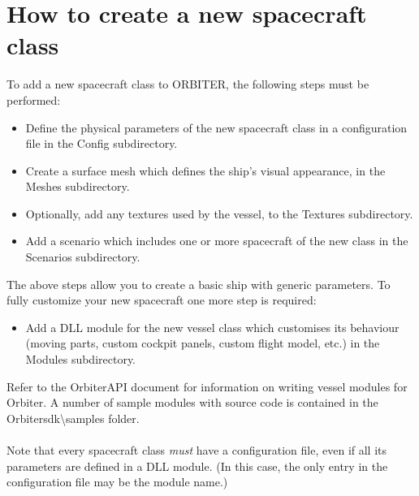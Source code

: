 \documentclass[Orbiter Developer Manual.tex]{subfiles}
\begin{document}
\section{How to create a new spacecraft class}
To add a new spacecraft class to ORBITER, the following steps must be performed:

\begin{itemize}
\item Define the physical parameters of the new spacecraft class in a configuration file in the Config subdirectory.
\item Create a surface mesh which defines the ship’s visual appearance, in the Meshes subdirectory.
\item Optionally, add any textures used by the vessel, to the Textures subdirectory.
\item Add a scenario which includes one or more spacecraft of the new class in the Scenarios subdirectory.
\end{itemize}

\noindent
The above steps allow you to create a basic ship with generic parameters. To fully customize your new spacecraft one more step is required:

\begin{itemize}
\item Add a DLL module for the new vessel class which customises its behaviour (moving parts, custom cockpit panels, custom flight model, etc.) in the Modules subdirectory.
\end{itemize}

Refer to the OrbiterAPI document for information on writing vessel modules for Orbiter. A number of sample modules with source code is contained in the Orbitersdk\textbackslash samples folder.\\
\\
Note that every spacecraft class \textit{must} have a configuration file, even if all its parameters are defined in a DLL module. (In this case, the only entry in the configuration file may be the module name.)
\end{document}
